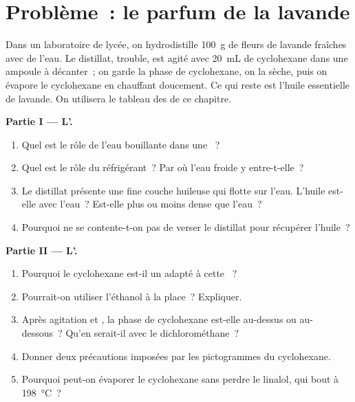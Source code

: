 \clearpage %
\section{Problème~: le parfum de la lavande}

\begin{problem}
\label{pb:g10:chemical-species:1}
Dans un laboratoire de lycée, on hydrodistille \qty{100}{g} de fleurs
de lavande fraîches avec de l'eau. Le distillat, trouble, est agité avec
\qty{20}{mL} de cyclohexane dans une ampoule à décanter~; on garde la
phase de cyclohexane, on la sèche, puis on évapore le cyclohexane en
chauffant doucement. Ce qui reste est l'huile essentielle de lavande. On
utilisera le tableau des  de ce chapitre.

\medskip
\noindent\textbf{Partie I --- L'.}
\begin{enumerate}
  \item Quel est le rôle de l'eau bouillante dans une ~?
  \item Quel est le rôle du réfrigérant~? Par où l'eau froide y
        entre-t-elle~?
  \item Le distillat présente une fine couche huileuse qui flotte sur
        l'eau. L'huile est-elle  avec l'eau~? Est-elle plus ou
        moins dense que l'eau~?
  \item Pourquoi ne se contente-t-on pas de verser le distillat pour
        récupérer l'huile~?
\end{enumerate}

\medskip
\noindent\textbf{Partie II --- L'.}
\begin{enumerate}[resume]
  \item Pourquoi le cyclohexane est-il un  adapté à cette
        ~?
  \item Pourrait-on utiliser l'éthanol à la place~? Expliquer.
  \item Après agitation et , la phase de cyclohexane est-elle
        au-dessus ou au-dessous~? Qu'en serait-il avec le
        dichlorométhane~?
  \item Donner deux précautions imposées par les pictogrammes du
        cyclohexane.
  \item Pourquoi peut-on évaporer le cyclohexane sans perdre le
        linalol, qui bout à \qty{198}{\celsius}~?
\end{enumerate}


\end{problem}
